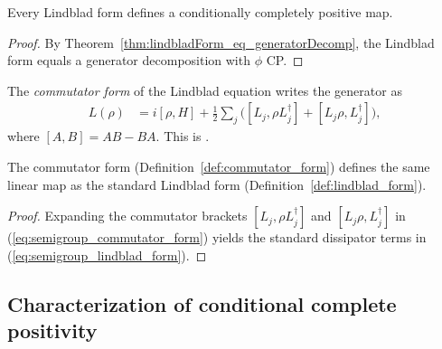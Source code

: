 \begin{theorem}
    \label{thm:lindbladForm_isCCP}
    \leanok
    Every Lindblad form defines a conditionally completely positive map.
\end{theorem}

\begin{proof}
    \leanok
    By Theorem~\ref{thm:lindbladForm_eq_generatorDecomp}, the Lindblad
    form equals a generator decomposition with $\phi$ CP.
\end{proof}

\begin{definition}\label{def:commutator_form}
    \leanok
    The \emph{commutator form} of the Lindblad equation writes
    the generator as
    \begin{align}
        L(\rho)
        &= i[\rho,H]
        + \tfrac{1}{2}\sum_j
        \bigl([L_j,\rho L_j^\dagger]
        + [L_j\rho,L_j^\dagger]\bigr),
        \label{eq:semigroup_commutator_form}
    \end{align}
    where $[A,B] = AB - BA$.
    This is \cite[Equation~(7.22)]{Wolf2012Quantum}.
\end{definition}

\begin{theorem}
    \label{thm:commutatorForm_eq_toLinearMap}
    \leanok
    The commutator form (Definition~\ref{def:commutator_form}) defines
    the same linear map as the standard Lindblad form
    (Definition~\ref{def:lindblad_form}).
\end{theorem}

\begin{proof}\leanok
    Expanding the commutator brackets
    $[L_j,\rho L_j^\dagger]$ and $[L_j\rho,L_j^\dagger]$
    in (\ref{eq:semigroup_commutator_form}) yields the standard dissipator
    terms in (\ref{eq:semigroup_lindblad_form}).
\end{proof}

\subsection{Characterization of conditional complete positivity}

